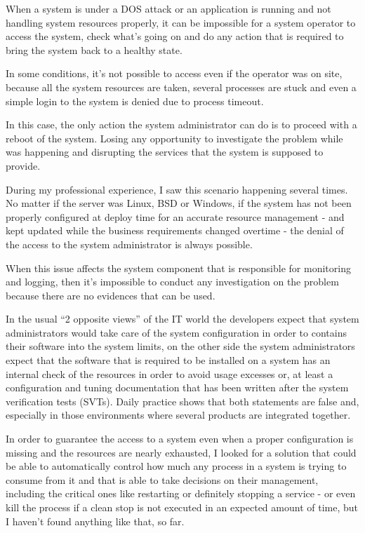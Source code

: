 \documentclass[conference]{IEEEtran}
\begin{document}
When a system is under a DOS attack or an application is running and not handling system resources properly, it can be impossible for a system operator to access the system, check what’s going on and do any action that is required to bring the system back to a healthy state.

In some conditions, it’s not possible to access even if the operator was on site, because all the system resources are taken, several processes are stuck and even a simple login to the system is denied due to process timeout.

In this case, the only action the system administrator can do is to proceed with a reboot of the system. Losing any opportunity to investigate the problem while was happening and disrupting the services that the system is supposed to provide.

During my professional experience, I saw this scenario happening several times. No matter if the server was Linux, BSD or Windows, if the system has not been properly configured at deploy time for an accurate resource management - and kept updated while the business requirements changed overtime - the denial of the access to the system administrator is always possible.

When this issue affects the system component that is responsible for monitoring and logging, then it’s impossible to conduct any investigation on the problem because there are no evidences that can be used.

In the usual “2 opposite views” of the IT world the developers expect that system administrators would take care of the system configuration in order to contains their software into the system limits, on the other side the system administrators expect that the software that is required to be installed on a system has an internal check of the resources in order to avoid usage excesses or, at least a configuration and tuning documentation that has been written after the system verification tests (SVTs). Daily practice shows that both statements are false and, especially in those environments where several products are integrated together.

In order to guarantee the access to a system even when a proper configuration is missing and the resources are nearly exhausted, I looked for a solution that could be able to automatically control how much any process in a system is trying to consume from it and that is able to take decisions on their management, including the critical ones like restarting or definitely stopping a service - or even kill the process if a clean stop is not executed in an expected amount of time, but I haven’t found anything like that, so far. 
\end{document}
